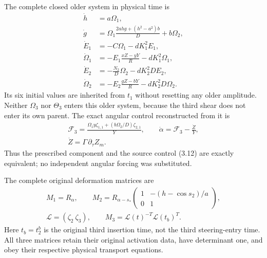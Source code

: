 The complete closed older system in physical time is
\begin{equation}\label{tr:closed}
 \begin{aligned}
 \dot h&=a\Omega_1,\\
 \dot g&=\Omega_1\frac{2ahg+(h^2-a^2)b}{D}+b\Omega_2,\\
 \dot E_1&=-C\Omega_1-dK_1^2E_1,\\
 \dot\Omega_1&=-E_1\frac{xZ-yY}{R}-dK_1^2\Omega_1,\\
 \dot E_2&=-\frac{N_2}{D}\Omega_2-dK_2^2DE_2,\\
 \dot\Omega_2&=-E_2\frac{gZ-bY}{R}-dK_2^2D\Omega_2.
 \end{aligned}
\end{equation}
Its six initial values are inherited from $t_1$ without resetting any
older amplitude. Neither $\Omega_3$ nor $\Theta_3$ enters this
older system, because the third shear does not enter its own parent.
The exact angular control reconstructed from it is
\begin{equation}\label{tr:control}
 \begin{gathered}
 \mathcal F_3=
 \frac{\Omega_1y\zeta_{1,1}+(b\Omega_2/D)\zeta_{2,1}}{Y},
 \qquad
 \dot\alpha=\mathcal F_3-\frac{\dot Z}{Y},\\
 \dot Z=\Gamma\,\partial_\tau Z_m.
 \end{gathered}
\end{equation}
Thus the prescribed component and the source control (3.12) are
exactly equivalent; no independent angular forcing was substituted.

The complete original deformation matrices are
\begin{equation}\label{tr:matrices}
 \begin{gathered}
 M_1=R_\alpha,\qquad
 M_2=R_{\alpha-s_*}
 \begin{pmatrix}1&-(h-\cos s_2)/a\\0&1\end{pmatrix},\\
 \mathcal L=(\zeta_2\ \zeta_3),\qquad
 M_3=\mathcal L(t)^{-T}\mathcal L(t_b)^T.
 \end{gathered}
\end{equation}
Here $t_b=t_2^b$ is the original third insertion time, not the
third steering-entry time. All three matrices retain their original
activation data, have determinant one, and obey their respective
physical transport equations.

